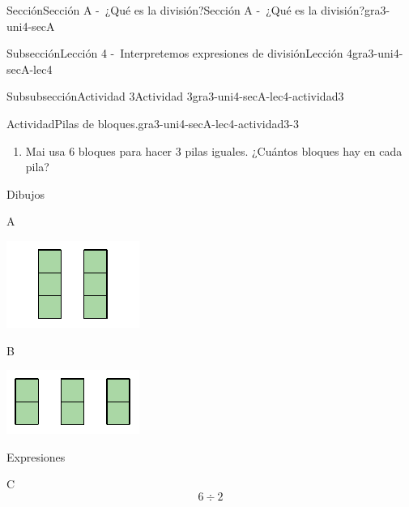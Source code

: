 \documentclass[twoside,10pt,]{article}
\begin{document}
\begin{sectionptx}{Sección}{Sección A -~¿Qué es la división?}{}{Sección A -~¿Qué es la división?}{}{}{gra3-uni4-secA}
\begin{subsectionptx}{Subsección}{Lección 4 -~Interpretemos expresiones de división}{}{Lección 4}{}{}{gra3-uni4-secA-lec4}
\begin{subsubsectionptx}{Subsubsección}{Actividad 3}{}{Actividad 3}{}{}{gra3-uni4-secA-lec4-actividad3}
\begin{activity}{Actividad}{Pilas de bloques.}{gra3-uni4-secA-lec4-actividad3-3}
\begin{enumerate}
\item{}Mai usa 6 bloques para hacer 3 pilas iguales. ¿Cuántos bloques hay en cada pila?%
\end{enumerate}
Dibujos%
\begin{sidebyside}{2}{0.05}{0.05}{0.1}%
\begin{sbspanel}{0.4}%
A%
\par
\includegraphics[width=\linewidth]{external/svg-source/tikz-file-149316.pdf}
\end{sbspanel}%
\begin{sbspanel}{0.4}%
B%
\par
\includegraphics[width=\linewidth]{external/svg-source/tikz-file-149317.pdf}
\end{sbspanel}%
\end{sidebyside}%
\par
Expresiones%
\begin{sidebyside}{2}{0.05}{0.05}{0.1}%
\begin{sbspanel}{0.4}%
C%
\begin{equation*}
6\div 2
\end{equation*}
%
\end{sbspanel}%

\end{sidebyside}
\end{activity}
\end{subsubsectionptx}
\end{subsectionptx}
\end{sectionptx}
\end{document}
